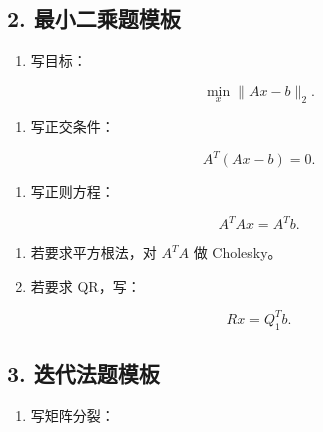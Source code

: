 \documentclass[11pt,a4paper]{ctexart}
\begin{document}

\subsection*{2. 最小二乘题模板}


\begin{enumerate}

\item 写目标：

\end{enumerate}

\[
\min_x\|Ax-b\|_2.
\]

\begin{enumerate}

\item 写正交条件：

\end{enumerate}

\[
A^T(Ax-b)=0.
\]

\begin{enumerate}

\item 写正则方程：

\end{enumerate}

\[
A^TAx=A^Tb.
\]

\begin{enumerate}

\item 若要求平方根法，对 $A^TA$ 做 Cholesky。

\item 若要求 QR，写：

\end{enumerate}

\[
Rx=Q_1^Tb.
\]


\subsection*{3. 迭代法题模板}


\begin{enumerate}

\item 写矩阵分裂：

\end{enumerate}
\end{document}
